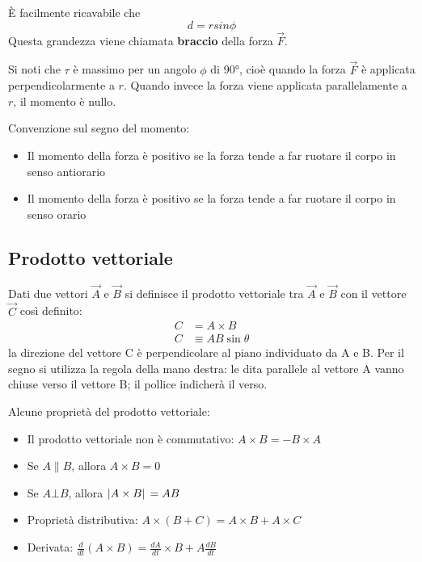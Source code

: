 \documentclass[a4paper,11pt,oneside]{book}
\begin{document}
È facilmente ricavabile che 
\begin{equation*}
    d = r sin \phi
\end{equation*}
Questa grandezza viene chiamata \textbf{braccio} della forza $\vec{F}$.

Si noti che $\tau$ è massimo per un angolo $\phi$ di 90°, cioè quando la forza $\vec{F}$ è applicata perpendicolarmente a $r$. Quando invece la forza viene applicata
parallelamente a $r$, il momento è nullo.

Convenzione sul segno del momento:
\begin{itemize}
    \item Il momento della forza è positivo se la forza tende a far ruotare il corpo in senso antiorario
    \item Il momento della forza è positivo se la forza tende a far ruotare il corpo in senso orario
\end{itemize}

\subsection{Prodotto vettoriale}
Dati due vettori $\vec{A}$ e $\vec{B}$ si definisce il prodotto vettoriale tra $\vec{A}$ e $\vec{B}$ con il vettore $\vec{C}$ così definito:
\begin{align*}
    C &= A \times B \\
    C &\equiv AB \sin{\theta}
\end{align*}
la direzione del vettore C è perpendicolare al piano individuato da A e B. Per il segno si utilizza la regola della mano destra: le dita parallele al vettore A vanno chiuse verso il vettore B; il pollice indicherà il verso.

Alcune proprietà del prodotto vettoriale:
\begin{itemize}
    \item Il prodotto vettoriale non è commutativo: $A \times B = -B \times A$
    \item Se $A \parallel B$, allora $A \times B = 0$
    \item Se $A \bot B$, allora $\abs*{A \times B} = AB$
    \item Proprietà distributiva: $A \times (B + C) = A \times B + A \times C$
    \item Derivata: $\tfrac{d}{dt}(A \times B) = \tfrac{dA}{dt} \times B + A \tfrac{dB}{dt}$
\end{itemize}
\end{document}
